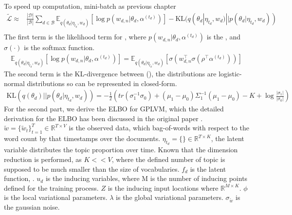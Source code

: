 To speed up computation, mini-batch as previous chapter
\begin{align*}
\tilde{\mathcal{L}}\approx&\frac{|\mathcal{D}|}{|\mathcal{B}|}\sum_{d\in\mathcal{B}}\mathbb{E}_{ q(\theta_d|\eta_{t_d},w_d)}[\log p(w_{d,n}|\theta_d,\alpha^{(t_d)})]-\text{KL}(q(\theta_d|\eta_{t_d},w_d)||p(\theta_d|\eta_{t_d},w_d))\\
\end{align*}
The first term is the likelihood term for , where $ p(w_{d,n}|\theta_d,\alpha^{(t_d)}) $ is the , and $ \sigma(\cdot) $ is the softmax function.
\begin{align*}
\mathbb{E}_{ q(\theta_d|\eta_{t_d},w_d)}[\log p(w_{d,n}|\theta_d,\alpha^{(t_d)})]=\mathbb{E}_{ q(\theta_d|\eta_{t_d},w_d)}[\sigma(w_{d,n}^\top\sigma(\rho^\top\alpha^{(t_d)}))]
\end{align*}
The second term is the KL-divergence between (), the distributions are logistic-normal distributions so can be represented in closed-form.
\begin{align*}
\text{KL}(q(\theta_d)||p(\theta_d|\eta_{t_d},w_d))=-\frac{1}{2}\left(tr(\sigma_1^{-1}\sigma_0)+(\mu_1-\mu_0)\Sigma_1^{-1}(\mu_1-\mu_0)-K+\log\frac{|\sigma_1|}{|\sigma_0|}\right)
\end{align*}
For the second part, we derive the ELBO for GPLVM, which the detailed derivation for the ELBO has been discussed in the original paper \cite{titsias_bayesian_nodate}. $ \tilde{w}=\{\tilde{w}_t\}^{T}_{t=1}\in\mathbb{R}^{T\times V} $ is the observed data, which bag-of-words with respect to the word count by that timestamps over the documents. $ \eta_{t_d}=\{\}\in\mathbb{R}^{T\times K} $, the latent variable distributes the topic proportion over time. Known that the dimension reduction is performed, as $ K<<V $, where the defined number of topic is supposed to be much smaller than the size of vocabularies. 
$ f_d $ is the latent function, . $ u_d $ is the inducing variables, where M is the number of inducing points defined for the training process. $ Z $ is the inducing input locations where $ \mathbb{R}^{M\times K} $. 
$ \phi $ is the local variational parameters. $ \lambda $ is the global variational parameters. $ \sigma_{\tilde{w}} $ is the gaussian noise.



